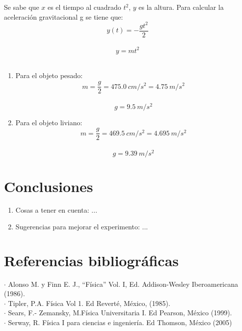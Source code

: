 \begin{multicols}{2}
Se sabe que $x$ es el tiempo al cuadrado $t^2$, $y$ es la altura. Para calcular la aceleración gravitacional g se tiene que: \\
\[ y(t) = - \dfrac{g t^2}{2} \] \\
\[ y = m t^2\] \\

\begin{enumerate}
    \item Para el objeto pesado: \[m = \dfrac{g}{2} = 475.0 \ cm/s^2 = 4.75 \ m/s^2\] \\ \[g = 9.5 \ m/s^2\]
    \item Para el objeto liviano:\[m = \dfrac{g}{2} = 469.5 \ cm/s^2 = 4.695 \ m/s^2\] \\ \[g = 9.39 \ m/s^2\]
\end{enumerate}



\section*{Conclusiones} 
\begin{enumerate}
    \item Cosas a tener en cuenta: ...
    \item Sugerencias para mejorar el experimento: ...
\end{enumerate}
\section*{Referencias bibliográficas}
\small{
$\cdot$ Alonso M. y Finn E. J., “Física” Vol. I, Ed. Addison-Wesley Iberoamericana (1986). \\ 
$\cdot$ Tipler, P.A. Física Vol 1. Ed Reverté, México, (1985).\\
$\cdot$ Sears, F.- Zemansky, M.Física Universitaria I. Ed Pearson, México (1999).\\
$\cdot$ Serway, R. Física I para ciencias e ingeniería. Ed Thomson, México (2005)
}
\end{multicols}